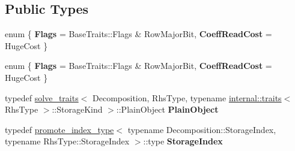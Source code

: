 \subsection*{Public Types}
\begin{DoxyCompactItemize}
\item 
\mbox{\label{struct_eigen_1_1internal_1_1traits_3_01_solve_3_01_decomposition_00_01_rhs_type_01_4_01_4_ae1173ddab85458d810a4fef335e48b61}} 
enum \{ {\bfseries Flags} = Base\+Traits\+:\+:Flags \& Row\+Major\+Bit, 
{\bfseries Coeff\+Read\+Cost} = Huge\+Cost
 \}
\item 
\mbox{\label{struct_eigen_1_1internal_1_1traits_3_01_solve_3_01_decomposition_00_01_rhs_type_01_4_01_4_acd675b3011826a1640978173207a53e3}} 
enum \{ {\bfseries Flags} = Base\+Traits\+:\+:Flags \& Row\+Major\+Bit, 
{\bfseries Coeff\+Read\+Cost} = Huge\+Cost
 \}
\item 
\mbox{\label{struct_eigen_1_1internal_1_1traits_3_01_solve_3_01_decomposition_00_01_rhs_type_01_4_01_4_ac3e6f6f9cceda71019bfe341bdda4bcb}} 
typedef \hyperlink{struct_eigen_1_1internal_1_1solve__traits}{solve\+\_\+traits}$<$ Decomposition, Rhs\+Type, typename \hyperlink{struct_eigen_1_1internal_1_1traits}{internal\+::traits}$<$ Rhs\+Type $>$\+::Storage\+Kind $>$\+::Plain\+Object {\bfseries Plain\+Object}
\item 
\mbox{\label{struct_eigen_1_1internal_1_1traits_3_01_solve_3_01_decomposition_00_01_rhs_type_01_4_01_4_a7b5f686dd63b88493d8b841d51dc4b36}} 
typedef \hyperlink{struct_eigen_1_1internal_1_1promote__index__type}{promote\+\_\+index\+\_\+type}$<$ typename Decomposition\+::\+Storage\+Index, typename Rhs\+Type\+::\+Storage\+Index $>$\+::type {\bfseries Storage\+Index}
\item 
\mbox{\label{struct_eigen_1_1internal_1_1traits_3_01_solve_3_01_decomposition_00_01_rhs_type_01_4_01_4_aaf0ecbe963cd667d5fcba412bbea7f35}} 

\end{DoxyCompactItemize}
